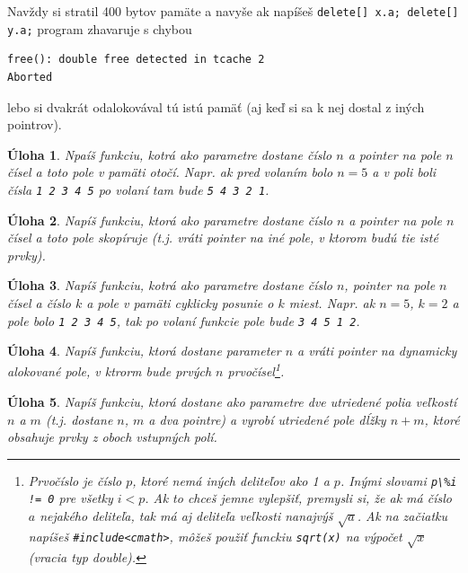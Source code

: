 \documentclass[10pt]{article}
\def\prg{\lstinline}
\newtheorem{uloha}{Úloha}
\begin{document}
Navždy si stratil 400 bytov pamäte a navyše ak napíšeš \prg!delete[] x.a; delete[] y.a;!
program zhavaruje s chybou

\begin{verbatim}
free(): double free detected in tcache 2
Aborted
\end{verbatim}

lebo si dvakrát odalokovával tú istú pamäť (aj keď si sa k nej dostal z iných pointrov).

\begin{uloha}
  Npaíš funkciu, kotrá ako parametre dostane číslo $n$ a pointer na  pole $n$
  čísel a toto pole v pamäti otočí. Napr. ak pred volaním bolo $n=5$
  a v poli boli čísla {\tt 1 2 3 4 5} po volaní tam bude {\tt 5 4 3 2 1}.
\end{uloha}

\begin{uloha}
  \label{uloha:arraycopy}
  Napíš funkciu, ktorá ako parametre dostane číslo $n$ a pointer na pole $n$
  čísel a toto pole skopíruje (t.j. vráti pointer na iné pole, v ktorom budú
  tie isté prvky).
\end{uloha}

\begin{uloha}
  Napíš funkciu, kotrá ako parametre dostane číslo $n$, pointer na  pole $n$
  čísel a číslo $k$ a pole v pamäti cyklicky posunie o $k$ miest.
  Napr. ak $n=5$, $k=2$ a pole bolo {\tt 1 2 3 4 5}, tak po volaní funkcie
  pole bude {\tt 3 4 5 1 2}.
\end{uloha}

\begin{uloha}
  \label{uloha:primetest}
  Napíš funkciu, ktorá dostane parameter $n$ a vráti pointer na dynamicky alokované
  pole, v ktrorm bude prvých $n$ prvočísel\footnote{%
    Prvočíslo je číslo $p$, ktoré nemá iných deliteľov ako 1 a $p$. Inými slovami
    \prg~p\%i != 0~ pre všetky $i<p$. Ak to chceš jemne vylepšiť, premysli si,
    že ak má číslo $a$ nejakého deliteľa, tak má aj deliteľa veľkosti 
    nanajvýš $\sqrt{a}$. Ak na začiatku napíšeš \prg!#include<cmath>!, môžeš
    použiť funckiu \prg!sqrt(x)! na výpočet $\sqrt{x}$ (vracia typ double).
    }.
\end{uloha}

\begin{uloha}
  \label{uloha:merge}
  Napíš funkciu, ktorá dostane ako parametre dve utriedené polia veľkostí $n$ a $m$
  (t.j. dostane $n$, $m$ a dva pointre) a vyrobí utriedené pole dĺžky $n+m$, 
  ktoré obsahuje prvky z oboch vstupných polí.
\end{uloha}
\end{document}
